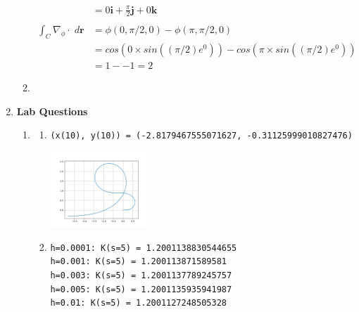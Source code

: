 \documentclass[11pt]{article}
\begin{document}
\begin{preview}
\begin{enumerate}
\begin{enumerate}
\begin{align*}
                                                               & =                                           0\textbf{i} +  \frac{\pi}{2}\textbf{j} +  0\textbf{k}                                    \\\\
                    \int_C \nabla_{\phi} \cdot \; d \textbf{r} & =\phi(0,\pi/2,0) - \phi(\pi,\pi/2,0)                                                                                                 \\
                                                               & = cos(0{\times}sin((\pi/2)e^{0}))  - cos(\pi{\times}sin((\pi/2)e^{0}))                                                               \\
                                                               & = 1 - -1 = 2
                  \end{align*}
            \item
          \end{enumerate}
    \item \textbf{Lab Questions}
          \begin{enumerate}
            \item
                  \begin{enumerate}
                    \item \texttt{(x(10), y(10)) = (-2.8179467555071627, -0.31125999010827476)}
                          \begin{center}
                            \includegraphics[width=0.33\textwidth]{inc/q4ai.png}
                          \end{center}
                    \item
                          \texttt{h=0.0001: K(s=5) = 1.2001138830544655} \\
                          \texttt{h=0.001: K(s=5) = 1.200113871589581} \\
                          \texttt{h=0.003: K(s=5) = 1.2001137789245757} \\
                          \texttt{h=0.005: K(s=5) = 1.2001135935941987} \\
                          \texttt{h=0.01: K(s=5) = 1.2001127248505328} \\\\

\end{enumerate}
\end{enumerate}
\end{enumerate}
\end{preview}
\end{document}
